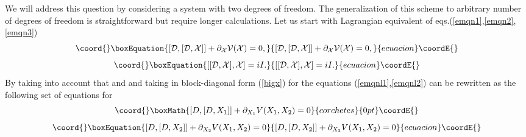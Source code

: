 \documentclass[a4paper,11pt]{article}
\begin{document}
We will address this question by considering a system with two
degrees of freedom. The generalization of this scheme to arbitrary
number of degrees of freedom is straightforward but require longer
calculations. Let us start with Lagrangian equivalent of
eqs.(\ref{emqn1},\ref{emqn2},\ref{emqn3})
\begin{equation}\coord{}\boxEquation{
[{\cal D},[{\cal D},{\cal X}]] + \partial_{\cal X} {\cal V}({\cal
X})=0, \label{emqnl1}
}{
[{\cal D},[{\cal D},{\cal X}]] + \partial_{\cal X} {\cal V}({\cal
X})=0, }{ecuacion}\coordE{}\end{equation}
\begin{equation}\coord{}\boxEquation{
[[{\cal D},{\cal X}],{\cal X}]=iI. \label{emqnl2}
}{
[[{\cal D},{\cal X}],{\cal X}]=iI. }{ecuacion}\coordE{}\end{equation}
By taking into account that \coordHE{} and
\coordHE{} and taking \coordHE{} in
block-diagonal form (\ref{bigx}) for \coordHE{} the equations
(\ref{emqnl1},\ref{emqnl2}) can be rewritten as the following set
of equations for \coordHE{}
\begin{displaymath}\coord{}\boxMath{
[ D, [ D,X_1 ] ] + \partial_{X_1} V(X_1,X_2)=0
}{corchetes}{0pt}\coordE{}\end{displaymath}
\begin{equation}\coord{}\boxEquation{
[ D, [ D,X_2 ] ] + \partial_{X_2} V(X_1,X_2)=0 \label{ep1}
}{
[ D, [ D,X_2 ] ] + \partial_{X_2} V(X_1,X_2)=0 }{ecuacion}\coordE{}\end{equation}
\end{document}
